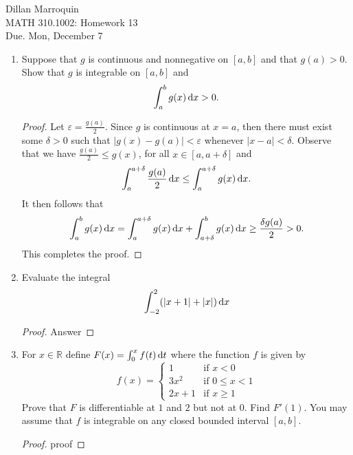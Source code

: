 \documentclass{article}
\begin{document}
    \noindent Dillan Marroquin\\ MATH 310.1002: Homework 13\\
    Due. Mon, December 7

    \begin{enumerate}
        \item Suppose that $g$ is continuous and nonnegative on $[a,b]$ and that $g(a) > 0$. Show that $g$ is integrable on $[a,b]$ and
            \[\int_a^b g(x) \dif x > 0.\]
        \begin{proof}
            Let $\varepsilon=\frac{g(a)}{2}$. Since $g$ is continuous at $x=a$, then there must exist some $\delta > 0$ such that $|g(x)-g(a)| < \varepsilon$ whenever $|x-a| < \delta$. Observe that we have $\frac{g(a)}{2} \leq g(x)$, for all $x \in [a,a+\delta]$ and
                \begin{align*}
                    \int_a^{a+\delta} \frac{g(a)}{2} \dif x \leq \int_a^{a+\delta} g(x) \dif x.
                \end{align*}
            It then follows that
                \begin{align*}
                    \int_a^b g(x) \dif x = \int_a^{a+ \delta} g(x) \dif x + \int_{a+\delta}^b g(x) \dif x \geq \frac{\delta g(a)}{2} > 0.
                \end{align*}
            This completes the proof.
        \end{proof}
    
        \item Evaluate the integral
            \[\int_{-2}^2 (|x+1|+|x|) \dif x\]
        \begin{proof}
            Answer
        \end{proof}
        
        \item For $x \in \mathbb{R}$ define $F(x) = \int_0^x f(t) \dif t$ where the function $f$ is given by
            \[f(x) = 
            \begin{cases}
                1   & \text{if $x < 0$}\\
                3x^2    &   \text{if $0 \leq x < 1$}\\
                2x+1    &   \text{if $x \geq 1$}    
            \end{cases}\]
        Prove that $F$ is differentiable at $1$ and $2$ but not at $0$. Find $F'(1)$. You may assume that $f$ is integrable on any closed bounded interval $[a,b]$.
        \begin{proof}
            proof
        \end{proof}
        

\end{enumerate}
\end{document}
